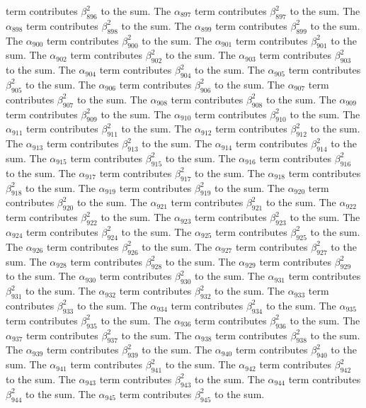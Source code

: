 \begin{lemma}
term contributes $\beta_{896}^{2}$ to the sum. The $\alpha_{897}$ term contributes $\beta_{897}^{2}$ to the sum. The $\alpha_{898}$ term contributes $\beta_{898}^{2}$ to the sum. The $\alpha_{899}$ term contributes $\beta_{899}^{2}$ to the sum. The $\alpha_{900}$ term contributes $\beta_{900}^{2}$ to the sum. The $\alpha_{901}$ term contributes $\beta_{901}^{2}$ to the sum. The $\alpha_{902}$ term contributes $\beta_{902}^{2}$ to the sum. The $\alpha_{903}$ term contributes $\beta_{903}^{2}$ to the sum. The $\alpha_{904}$ term contributes $\beta_{904}^{2}$ to the sum. The $\alpha_{905}$ term contributes $\beta_{905}^{2}$ to the sum. The $\alpha_{906}$ term contributes $\beta_{906}^{2}$ to the sum. The $\alpha_{907}$ term contributes $\beta_{907}^{2}$ to the sum. The $\alpha_{908}$ term contributes $\beta_{908}^{2}$ to the sum. The $\alpha_{909}$ term contributes $\beta_{909}^{2}$ to the sum. The $\alpha_{910}$ term contributes $\beta_{910}^{2}$ to the sum. The $\alpha_{911}$ term contributes $\beta_{911}^{2}$ to the sum. The $\alpha_{912}$ term contributes $\beta_{912}^{2}$ to the sum. The $\alpha_{913}$ term contributes $\beta_{913}^{2}$ to the sum. The $\alpha_{914}$ term contributes $\beta_{914}^{2}$ to the sum. The $\alpha_{915}$ term contributes $\beta_{915}^{2}$ to the sum. The $\alpha_{916}$ term contributes $\beta_{916}^{2}$ to the sum. The $\alpha_{917}$ term contributes $\beta_{917}^{2}$ to the sum. The $\alpha_{918}$ term contributes $\beta_{918}^{2}$ to the sum. The $\alpha_{919}$ term contributes $\beta_{919}^{2}$ to the sum. The $\alpha_{920}$ term contributes $\beta_{920}^{2}$ to the sum. The $\alpha_{921}$ term contributes $\beta_{921}^{2}$ to the sum. The $\alpha_{922}$ term contributes $\beta_{922}^{2}$ to the sum. The $\alpha_{923}$ term contributes $\beta_{923}^{2}$ to the sum. The $\alpha_{924}$ term contributes $\beta_{924}^{2}$ to the sum. The $\alpha_{925}$ term contributes $\beta_{925}^{2}$ to the sum. The $\alpha_{926}$ term contributes $\beta_{926}^{2}$ to the sum. The $\alpha_{927}$ term contributes $\beta_{927}^{2}$ to the sum. The $\alpha_{928}$ term contributes $\beta_{928}^{2}$ to the sum. The $\alpha_{929}$ term contributes $\beta_{929}^{2}$ to the sum. The $\alpha_{930}$ term contributes $\beta_{930}^{2}$ to the sum. The $\alpha_{931}$ term contributes $\beta_{931}^{2}$ to the sum. The $\alpha_{932}$ term contributes $\beta_{932}^{2}$ to the sum. The $\alpha_{933}$ term contributes $\beta_{933}^{2}$ to the sum. The $\alpha_{934}$ term contributes $\beta_{934}^{2}$ to the sum. The $\alpha_{935}$ term contributes $\beta_{935}^{2}$ to the sum. The $\alpha_{936}$ term contributes $\beta_{936}^{2}$ to the sum. The $\alpha_{937}$ term contributes $\beta_{937}^{2}$ to the sum. The $\alpha_{938}$ term contributes $\beta_{938}^{2}$ to the sum. The $\alpha_{939}$ term contributes $\beta_{939}^{2}$ to the sum. The $\alpha_{940}$ term contributes $\beta_{940}^{2}$ to the sum. The $\alpha_{941}$ term contributes $\beta_{941}^{2}$ to the sum. The $\alpha_{942}$ term contributes $\beta_{942}^{2}$ to the sum. The $\alpha_{943}$ term contributes $\beta_{943}^{2}$ to the sum. The $\alpha_{944}$ term contributes $\beta_{944}^{2}$ to the sum. The $\alpha_{945}$ term contributes $\beta_{945}^{2}$ to the sum. 
\end{lemma}
